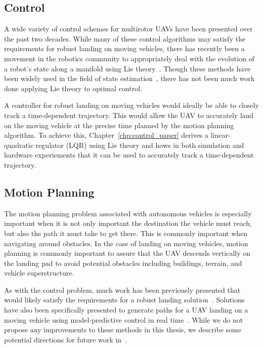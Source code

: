 \subsection{Control}
A wide variety of control schemes for multirotor UAVs have been presented over
the past two decades. While many of these control algorithms may satisfy the
requirements for robust landing on moving vehicles, there has recently been a
movement in the robotics community to appropriately deal with the evolution of a
robot's state along a manifold using Lie theory~\cite{sola2018micro}. Though
these methods have been widely used in the field of state
estimation~\cite{sola2017quaternion, koch2017relative}, there has not been much
work done applying Lie theory to optimal control.

A controller for robust landing on moving vehicles would ideally be able to
closely track a time-dependent trajectory. This would allow the UAV to
accurately land on the moving vehicle at the precise time planned by the motion
planning algorithm. To achieve this, Chapter~\ref{chp:control_paper} derives a
linear-quadratic regulator (LQR) using Lie theory and hows in both simulation
and hardware experiements that it can be used to accurately track a
time-dependent trajectory.

\subsection{Motion Planning}
The motion planning problem associated with autonomous vehicles is especially
important when it is not only important the destination the vehicle must reach,
but also the path it must take to get there. This is commonly important when
navigating around obstacles. In the case of landing on moving vehicles, motion
planning is commonly important to assure that the UAV descends vertically on the
landing pad to avoid potential obstacles including buildings, terrain, and
vehicle superstructure.

As with the control problem, much work has been previously presented that would
likely satisfy the requirements for a robust landing
solution~\cite{mellinger2011minimum}. Solutions have also been specifically
presented to generate paths for a UAV landing on a moving
vehicle using model-predictive control in real time~\cite{baca2019autonomous}.
While we do not propose any improvements to these methods in this thesis, we
describe some potential directions for future work in~.

